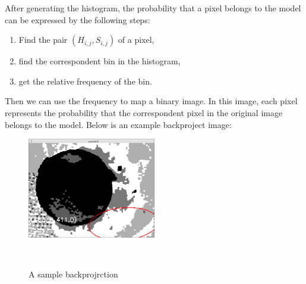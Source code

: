 After generating the histogram, the probability that a pixel belongs to the model can be expressed by the following steps:
\begin{enumerate}
  \item Find the pair $(H_{i,j},S_{i,j})$ of a pixel,
  \item find the correspondent bin in the histogram,
  \item get the relative frequency of the bin.
\end{enumerate}
Then we can use the frequency to map a binary image. In this image, each pixel represents the probability that the correspondent pixel in the original image belongs to the model. Below is an example backproject image:\\
\begin{figure}[h!]

  \centering
    \includegraphics[width=0.5\textwidth]{../Pictures/backproject.png}
    \caption{A sample backprojrction}\\
\end{figure}
